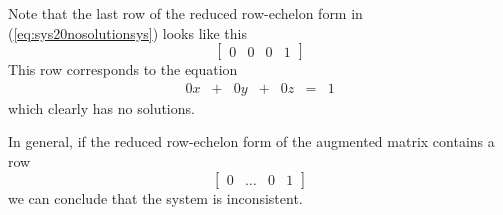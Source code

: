 \documentclass{ximera}
\begin{document}
\begin{observation}\label{ob:inconsistent} Note that the last row of the reduced row-echelon form in (\ref{eq:sys20nosolutionsys}) looks like this
$$\left[\begin{array}{ccc|c}  
 0&0&0&1
 \end{array}\right]$$
 This row corresponds to the equation
 $$\begin{array}{ccccccc}
     0x&+ &0y&+&0z&=&1
    \end{array}$$
 which clearly has no solutions.  
 
 In general, if the reduced row-echelon form of the augmented matrix contains a row
 $$\left[\begin{array}{ccc|c}  
 0&\ldots&0&1
 \end{array}\right]$$
 we can conclude that the system is inconsistent.
\end{observation}
\end{document}
